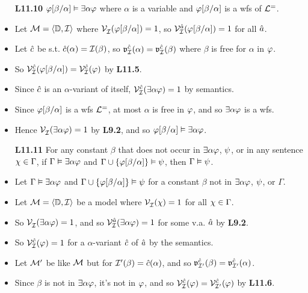 \documentclass[a4paper, 11pt]{article} %
\begin{document}
\begin{itemize}
  \item[\bf L11.10] $\varphi[\beta/\alpha] \vDash \exists\alpha\varphi$ where $\alpha$ is a variable and $\varphi[\beta/\alpha]$ is a wfs of $\mathcal{L}^=$.
    \item Let $\mathcal{M}=\langle\mathbb{D},\mathcal{I}\rangle$ where $\mathcal{V}_{\mathcal{I}}^{}(\varphi[\beta/\alpha])=1$, so $\mathcal{V}_{\mathcal{I}}^{\hat{a}}(\varphi[\beta/\alpha])=1$ for all $\hat{a}$.
    \item Let $\hat{c}$ be s.t. $\hat{c}(\alpha)=\mathcal{I}(\beta)$, so $\mathfrak{v}_{\mathcal{I}}^{\hat{c}}(\alpha)=\mathfrak{v}_{\mathcal{I}}^{\hat{c}}(\beta)$ where $\beta$ is free for $\alpha$ in $\varphi$.
    \item So $\mathcal{V}_{\mathcal{I}}^{\hat{c}}(\varphi[\beta/\alpha])=\mathcal{V}_{\mathcal{I}}^{\hat{c}}(\varphi)$ by \textbf{L11.5}.
    \item Since $\hat{c}$ is an $\alpha$-variant of itself, $\mathcal{V}_{\mathcal{I}}^{\hat{c}}(\exists \alpha\varphi)=1$ by semantics.
    \item Since $\varphi[\beta/\alpha]$ is a wfs $\mathcal{L}^=$, at most $\alpha$ is free in $\varphi$, and so $\exists \alpha\varphi$ is a wfs. 
    \item Hence $\mathcal{V}_{\mathcal{I}}^{}(\exists \alpha\varphi)=1$ by \textbf{L9.2}, and so $\varphi[\beta/\alpha] \vDash \exists\alpha\varphi$.
  \item[\bf L11.11] For any constant $\beta$ that does not occur in $\exists\alpha\varphi$, $\psi$, or in any sentence $\chi\in\Gamma$, if $\Gamma \vDash \exists\alpha\varphi$ and $\Gamma \cup \lbrace\varphi[\beta/\alpha]\rbrace \vDash \psi$, then $\Gamma \vDash \psi$.
    \item Let $\Gamma \vDash \exists\alpha\varphi$ and $\Gamma \cup \lbrace\varphi[\beta/\alpha]\rbrace \vDash \psi$ for a constant $\beta$ not in $\exists\alpha\varphi$, $\psi$, or $\Gamma$. 
    \item Let $\mathcal{M}=\langle\mathbb{D},\mathcal{I}\rangle$ be a model where $\mathcal{V}_{\mathcal{I}}^{}(\chi) = 1$ for all $\chi \in \Gamma$.
    \item So $\mathcal{V}_{\mathcal{I}}^{}(\exists \alpha\varphi) = 1$, and so $\mathcal{V}_{\mathcal{I}}^{\hat{a}}(\exists \alpha\varphi)=1$ for some v.a. $\hat{a}$ by \textbf{L9.2}.
    \item So $\mathcal{V}_{\mathcal{I}}^{\hat{c}}(\varphi)=1$ for a $\alpha$-variant $\hat{c}$ of $\hat{a}$ by the semantics.
    \item Let $\mathcal{M}'$ be like $\mathcal{M}$ but for $\mathcal{I}'(\beta)=\hat{c}(\alpha)$, and so $\mathfrak{v}_{\mathcal{I}'}^{\hat{c}}(\beta)=\mathfrak{v}_{\mathcal{I}'}^{\hat{c}}(\alpha)$.
    \item Since $\beta$ is not in $\exists \alpha\varphi$, it's not in $\varphi$, and so $\mathcal{V}_{\mathcal{I}}^{\hat{c}}(\varphi)=\mathcal{V}_{\mathcal{I}'}^{\hat{c}}(\varphi)$ by \textbf{L11.6}.

\end{itemize}
\end{document}
